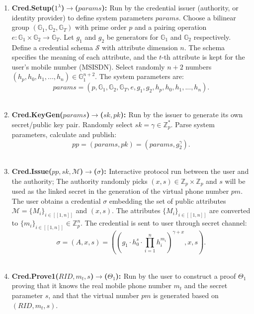 \begin{enumerate}
    \item{\bf{Cred.Setup($1^\lambda$)$\rightarrow$($params$): }}Run by the credential issuer (authority, or identity provider) to define system parameters $params$. Choose a bilinear group $(\mathbb{G}_{1}, \mathbb{G}_{2}, \mathbb{G}_{T})$ with prime order $p$ and a pairing operation $e: \mathbb{G}_{1} \times \mathbb{G}_{2} \longrightarrow \mathbb{G}_{T}$. Let $g_1$ and $g_2$ be generators for $\mathbb{G}_{1}$ and $\mathbb{G}_{2}$ respectively. Define a credential schema $\mathcal{S}$ with attribute dimension $n$. The schema specifies the meaning of each attribute, and the $t$-th attribute is kept for the user's mobile number (MSISDN). Select randomly $n+2$ numbers $(h_p, h_0, h_1, ..., h_n)\in\mathbb{G}_{1}^{n+2}$. The system parameters are:$$params=(p, \mathbb{G}_{1}, \mathbb{G}_{2}, \mathbb{G}_{T}, e, g_1, g_2, h_p, h_0, h_1, ..., h_n).$$\\
    
    \item{\bf{Cred.KeyGen($params$)$\rightarrow$($sk, pk$): }}Run by the issuer to generate its own secret/public key pair. Randomly select $sk=\gamma\in\mathbb{Z}_{p}^{*}$. Parse system parameters, calculate and publish: 
    $$pp=(params, pk)=(params, g_2^{\gamma}).$$ \\
    
    \item{\bf{Cred.Issue($pp, sk, \mathcal{M}$)$\rightarrow$($\sigma$): }}Interactive protocol run between the user and the authority; The authority randomly picks $(x, s)\in\mathbb{Z}_{p} \times \mathbb{Z}_{p}$ and $s$ will be used as the linked secret in the generation of the virtual phone number $pm$. The user obtains a credential $\sigma$ embedding the set of public attributes $\mathcal{M}=\{M_i\}_{i\in[[1, n]]}$ and $(x, s)$. The attributes $\{M_i\}_{i\in[[1, n]]}$ are converted to $\{m_i\}_{i\in[[1, n]]}\in\mathbb{Z}_p^n$. The credential is sent to user through secret channel:
    $$\sigma = (A, x, s)=(\left(g_{1} \cdot h_{0}^{s} \cdot \prod_{i=1}^{n} h_{i}^{m_{i}}\right)^{\gamma+x}, x, s).$$\\
    
    \item{\bf{Cred.Prove1($RID, m_t, s$)$\rightarrow$($\Theta_1$): }}Run by the user to construct a proof $\Theta_1$ proving that it knows the real mobile phone number $m_t$ and the secret parameter $s$, and that the virtual number $pm$ is generated based on $(RID, m_t, s)$.\\
    

\end{enumerate}
